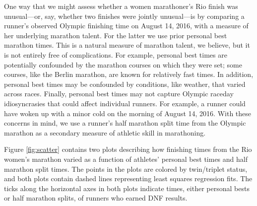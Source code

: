 \documentclass[12pt,titlepage]{article}
\begin{document}
One way that we might assess whether a women marathoner's Rio finish
was unusual---or, say, whether two finishes were jointly unusual---is
by comparing a runner's observed Olympic finishing time on August 14,
2016, with a measure of her underlying marathon talent.  For the
latter we use prior personal best marathon times.  This is a natural
measure of marathon talent, we believe, but it is not entirely free of
complications.  For example, personal best times are potentially
confounded by the marathon courses on which they were set; some
courses, like the Berlin marathon, are known for relatively fast
times.  In addition, personal best times may be confounded by
conditions, like weather, that varied across races.  Finally, personal
best times may not capture Olympic raceday idiosyncrasies that could
affect individual runners.  For example, a runner could have woken up
with a minor cold on the morning of August 14, 2016.  With these
concerns in mind, we use a runner's half marathon split time from the
Olympic marathon as a secondary measure of athletic skill in
marathoning.  

Figure \ref{fig:scatter} contains two plots describing how finishing
times from the Rio women's marathon varied as a function of athletes'
personal best times and half marathon split times.  The points in the
plots are colored by twin/triplet status, and both plots
contain %
dashed lines representing least squares regression fits.  The ticks
along the horizontal axes in both plots indicate times, either
personal bests or half marathon splits, of runners who earned DNF
results.\label{scatterplots}
\end{document}
